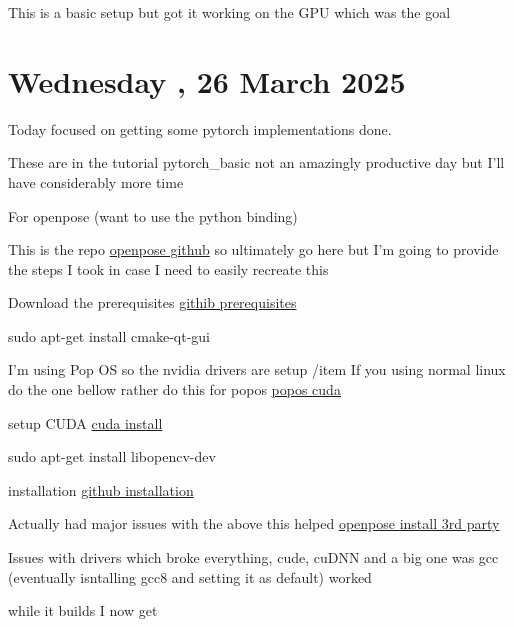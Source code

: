 This is a basic setup but got it working on the GPU which was the goal

\section[2025/03/26]{Wednesday , 26 March 2025}
\label{sec:20250326}

Today focused on getting some pytorch implementations done.

These are in the tutorial pytorch\_basic not an amazingly productive day but I'll have considerably more time

For openpose (want to use the python binding)

This is the repo \href{https://github.com/CMU-Perceptual-Computing-Lab/openpose}{openpose github} so ultimately go here
but I'm going to provide the steps I took in case I need to easily recreate this

\begin{compactitem}
	\item Download the prerequisites \href{https://github.com/CMU-Perceptual-Computing-Lab/openpose/blob/master/doc/installation/1_prerequisites.md#ubuntu-prerequisites}{githib prerequisites}
	\begin{compactitem}
		\item sudo apt-get install cmake-qt-gui
		\item I'm using Pop OS so the nvidia drivers are setup
		/item If you using normal linux do the one bellow rather do this for popos \href{https://support.system76.com/articles/cuda/}{popos cuda}
		\item setup CUDA \href{https://docs.nvidia.com/cuda/cuda-installation-guide-linux/}{cuda install}
		\item sudo apt-get install libopencv-dev
	\end{compactitem}
	\item installation \href{https://github.com/CMU-Perceptual-Computing-Lab/openpose/blob/master/doc/installation/0_index.md#cmake-configuration}{github installation}
\end{compactitem}

Actually had major issues with the above this helped \href{https://amir-yazdani.github.io/post/openpose/}{openpose install 3rd party}

Issues with drivers which broke everything, cude, cuDNN and a big one was gcc
(eventually isntalling gcc8 and setting it as default) worked

while it builds I now get


